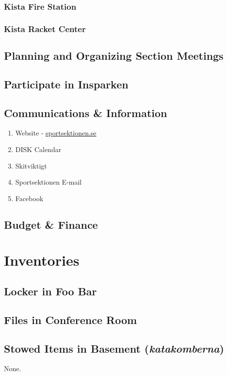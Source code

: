 \documentclass[12pt,a4paper]{article}
\begin{document}
			\subsubsection{Kista Fire Station}
			\subsubsection{Kista Racket Center}
		\subsection{Planning and Organizing Section Meetings}
		\subsection{Participate in Insparken}
		\subsection{Communications \& Information}
			\begin{enumerate}
				\item Website - \href{http://sportsektionen.se}{sportsektionen.se}
				\item DISK Calendar
				\item Skitviktigt
				\item Sportsektionen E-mail
				\item Facebook
			\end{enumerate}
		\subsection{Budget \& Finance}

	\section{Inventories}
		\subsection{Locker in Foo Bar}
		\subsection{Files in Conference Room}
		\subsection{Stowed Items in Basement (\emph{katakomberna})}
			None.
\end{document}
